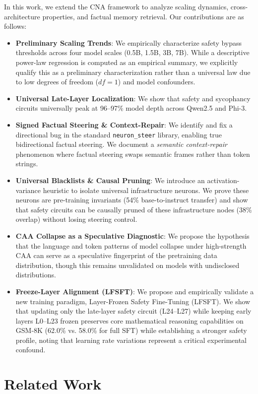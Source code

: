 \documentclass[11pt]{article}
\begin{document}
In this work, we extend the CNA framework to analyze scaling dynamics, cross-architecture properties, and factual memory retrieval. Our contributions are as follows:
\begin{itemize}
    \item \textbf{Preliminary Scaling Trends}: We empirically characterize safety bypass thresholds across four model scales (0.5B, 1.5B, 3B, 7B). While a descriptive power-law regression is computed as an empirical summary, we explicitly qualify this as a preliminary characterization rather than a universal law due to low degrees of freedom ($df=1$) and model confounders.
    \item \textbf{Universal Late-Layer Localization}: We show that safety and sycophancy circuits universally peak at 96--97\% model depth across Qwen2.5 and Phi-3.
    \item \textbf{Signed Factual Steering \& Context-Repair}: We identify and fix a directional bug in the standard \texttt{neuron\_steer} library, enabling true bidirectional factual steering. We document a \textit{semantic context-repair} phenomenon where factual steering swaps semantic frames rather than token strings.
    \item \textbf{Universal Blacklists \& Causal Pruning}: We introduce an activation-variance heuristic to isolate universal infrastructure neurons. We prove these neurons are pre-training invariants (54\% base-to-instruct transfer) and show that safety circuits can be causally pruned of these infrastructure nodes (38\% overlap) without losing steering control.
    \item \textbf{CAA Collapse as a Speculative Diagnostic}: We propose the hypothesis that the language and token patterns of model collapse under high-strength CAA can serve as a speculative fingerprint of the pretraining data distribution, though this remains unvalidated on models with undisclosed distributions.
    \item \textbf{Freeze-Layer Alignment (LFSFT)}: We propose and empirically validate a new training paradigm, Layer-Frozen Safety Fine-Tuning (LFSFT). We show that updating only the late-layer safety circuit (L24--L27) while keeping early layers L0--L23 frozen preserves core mathematical reasoning capabilities on GSM-8K (62.0\% vs. 58.0\% for full SFT) while establishing a stronger safety profile, noting that learning rate variations represent a critical experimental confound.
\end{itemize}

\section{Related Work}
\end{document}
